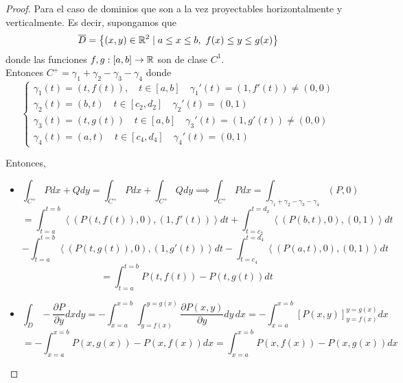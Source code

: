     \begin{proof}
        Para el caso de dominios que son a la vez proyectables horizontalmente y verticalmente. Es decir, supongamos que
        $$\overline{D} = \left\{ (x,y) \in \mathbb{R}^2 \mid a \leq x \leq b, \ f(x) \leq y \leq g(x) \right\}$$
        donde las funciones $f,g: [a,b] \to \mathbb{R}$ son de clase $C^1$.\\
        Entonces $C^+ = \gamma_1 + \gamma_2 - \gamma_3 - \gamma_4$ donde
        $$\begin{cases}
                \gamma_1(t) = (t, f(t)), \quad t \in [a,b] \quad \gamma_1'(t) = (1, f'(t)) \neq (0,0) \\
                \gamma_2(t) = (b,t) \quad t \in [c_2, d_2] \quad \gamma_2'(t) = (0,1)                 \\
                \gamma_3(t) = (t, g(t)) \quad t \in [a,b] \quad \gamma_3'(t) = (1, g'(t)) \neq (0,0)  \\
                \gamma_4(t) = (a,t) \quad t \in [c_4, d_4] \quad \gamma_4'(t) = (0,1)
            \end{cases}$$
    
        Entonces,
    
        \begin{itemize}
            \item 
            \[
            \int_{C^+} Pdx + Qdy = \int_{C^+} Pdx + \int_{C^+} Qdy 
            \implies \int_{C^+} Pdx = \int_{\gamma_1+\gamma_2-\gamma_3-\gamma_4} (P,0) 
            \]
            \[
            = \int_{t=a}^{t=b} \left\langle (P(t,f(t)), 0), (1, f'(t)) \right\rangle dt 
            + \int_{t=c_2}^{t=d_2} \left\langle (P(b,t), 0), (0,1) \right\rangle dt 
            \]
            \[
            - \int_{t=a}^{t=b} \left\langle (P(t,g(t)), 0), (1, g'(t)) \right\rangle dt 
            - \int_{t=c_4} ^{t=d_4} \left\langle (P(a,t), 0), (0,1) \right\rangle dt
            \]
            \[
            = \int_{t=a}^{t=b} P(t,f(t)) - P(t,g(t)) dt
            \]
        
            \item 
            \[
            \int_{D} -\frac{\partial P}{\partial y}dxdy 
            = -\int_{x=a}^{x=b} \int_{y=f(x)}^{y=g(x)} \frac{\partial P(x,y)}{\partial y} dy \,dx
            = -\int_{x=a}^{x=b} \left[ P(x,y) \right] _{y=f(x)}^{y=g(x)} dx
            \]
            \[
            = -\int_{x=a}^{x=b} P(x,g(x)) - P(x,f(x)) dx 
            = \int_{x=a}^{x=b} P(x,f(x)) - P(x,g(x)) dx
            \]
        \end{itemize}
        

\end{proof}
